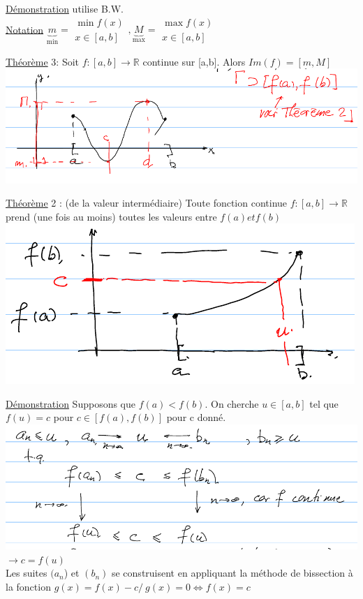 \documentclass[12pt,a4paper]{article}
\newcommand{\R}{\ensuremath{\mathbb{R}} }
\newcommand{\Theoreme}{\underline{Théorème} }
\begin{document}
{\underline{Démonstration} utilise B.W.\\
\underline{Notation} $\underbrace{m}_{\min} = \substack{\min f(x)\\ x \in [a,b]}, \underbrace{M}_{\max} = \substack{\max f(x)\\ x \in [a,b]}$
\begin{boite}
\Theoreme 3: Soit $f : [a,b] \to \R$ continue sur [a,b]. Alors $Im(f) =[m,M]$
\includegraphics[scale=0.5]{illustrations_Analyse/theo_3}
\end{boite}
\begin{boite}
\Theoreme 2 : (de la valeur intermédiaire) Toute fonction continue $f:[a,b] \to \R$ prend (une fois au moins) toutes les valeurs entre $f(a) et f(b)$\\
\includegraphics[scale=0.5]{illustrations_Analyse/theo_4}
\end{boite}
\underline{Démonstration} Supposons que $f(a) < f(b)$. On cherche $u \in [a,b]$ tel que $f(u) = c$ pour $c \in [f(a), f(b)]$ pour c donné.\\
\includegraphics[scale=0.5]{illustrations_Analyse/demo_theo_2} $\to c = f(u)$\\
Les suites $(a_n$) et $(b_n)$ se construisent en appliquant la méthode de bissection à la fonction $g(x) = f(x)-c /\ g(x) = 0 \Leftrightarrow f(x) = c$
}
\end{document}
